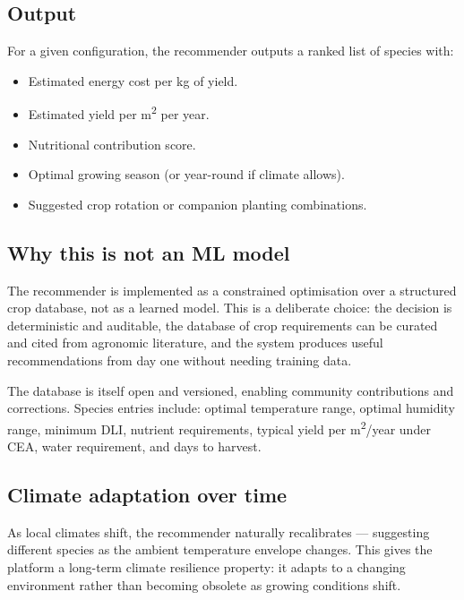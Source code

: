 \subsection{Output}

For a given configuration, the recommender outputs a ranked list of species with:

\begin{itemize}
  \item Estimated energy cost per kg of yield.
  \item Estimated yield per m\textsuperscript{2} per year.
  \item Nutritional contribution score.
  \item Optimal growing season (or year-round if climate allows).
  \item Suggested crop rotation or companion planting combinations.
\end{itemize}

\subsection{Why this is not an ML model}

The recommender is implemented as a constrained optimisation over a structured crop database, not as a learned model. This is a deliberate choice: the decision is deterministic and auditable, the database of crop requirements can be curated and cited from agronomic literature, and the system produces useful recommendations from day one without needing training data.

The database is itself open and versioned, enabling community contributions and corrections. Species entries include: optimal temperature range, optimal humidity range, minimum DLI, nutrient requirements, typical yield per m\textsuperscript{2}/year under CEA, water requirement, and days to harvest.

\subsection{Climate adaptation over time}

As local climates shift, the recommender naturally recalibrates --- suggesting different species as the ambient temperature envelope changes. This gives the platform a long-term climate resilience property: it adapts to a changing environment rather than becoming obsolete as growing conditions shift.
